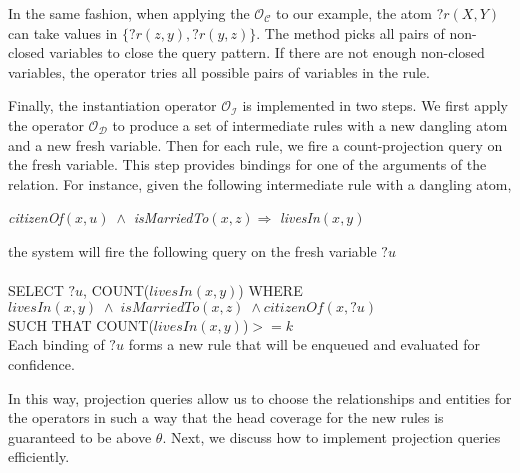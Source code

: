 In the same fashion, when applying the $\mathcal{O_C}$ to our example, the atom $?r(X, Y)$ can take values in $\{ ?r(z,y), ?r(y,z) \}$.
The method picks all pairs of non-closed variables to close the query pattern. If there are not enough non-closed variables, the operator tries
all possible pairs of variables in the rule.

Finally, the instantiation operator $\mathcal{O_I}$ is implemented in two steps. We first apply the operator $\mathcal{O_D}$ to produce a set of intermediate rules with a new dangling atom and a new fresh variable.
Then for each rule, we fire a count-projection query on the fresh variable. This step provides bindings for one of the arguments of the relation.
For instance, given the following intermediate rule with a dangling atom,

\begin{center}
\emph{citizenOf}$(x,u) \; \wedge$ \emph{isMarriedTo}$(x,z) \Rightarrow $ \emph{livesIn}$(x,y)$
\end{center}

\noindent the system will fire the following query on the fresh variable $?u$
\\ \\
\noindent
SELECT $?u$, COUNT($livesIn(x,y)$) WHERE\\
$livesIn(x,y) \; \wedge \; isMarriedTo(x,z) \; \wedge citizenOf(x, ?u)$\\
SUCH THAT COUNT($livesIn(x,y)$)$>= k$\\

\noindent Each binding of $?u$ forms a new rule that will be enqueued and evaluated for confidence.

In this way, projection queries allow us to choose the relationships and entities for the operators in such a way that the head coverage for the new rules is guaranteed to be above $\theta$.
Next, we discuss how to implement projection queries efficiently.

